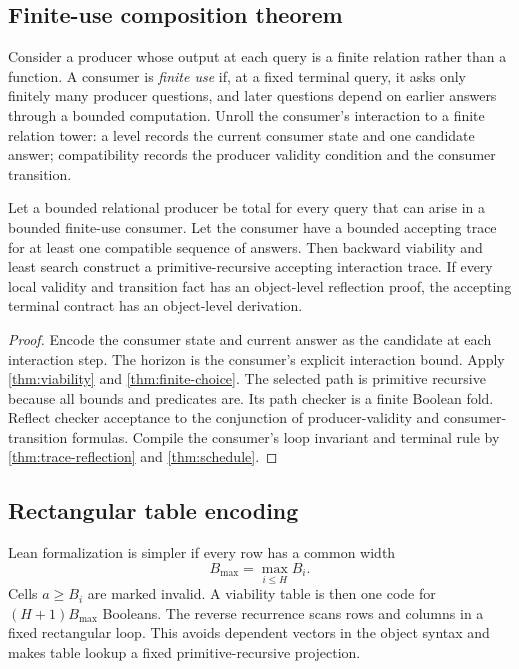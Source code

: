 \subsection{Finite-use composition theorem}

Consider a producer whose output at each query is a finite relation rather than a function.  A consumer is \emph{finite use} if, at a fixed terminal query, it asks only finitely many producer questions, and later questions depend on earlier answers through a bounded computation.  Unroll the consumer's interaction to a finite relation tower: a level records the current consumer state and one candidate answer; compatibility records the producer validity condition and the consumer transition.

\begin{theorem}\label{thm:finite-use}
Let a bounded relational producer be total for every query that can arise in a bounded finite-use consumer.  Let the consumer have a bounded accepting trace for at least one compatible sequence of answers.  Then backward viability and least search construct a primitive-recursive accepting interaction trace.  If every local validity and transition fact has an object-level reflection proof, the accepting terminal contract has an object-level derivation.
\end{theorem}

\begin{proof}
Encode the consumer state and current answer as the candidate at each interaction step.  The horizon is the consumer's explicit interaction bound.  Apply \cref{thm:viability} and \cref{thm:finite-choice}.  The selected path is primitive recursive because all bounds and predicates are.  Its path checker is a finite Boolean fold.  Reflect checker acceptance to the conjunction of producer-validity and consumer-transition formulas.  Compile the consumer's loop invariant and terminal rule by \cref{thm:trace-reflection} and \cref{thm:schedule}.
\end{proof}

\subsection{Rectangular table encoding}

Lean formalization is simpler if every row has a common width
\[
  B_{\max}=\max_{i\le H}B_i.
\]
Cells \(a\ge B_i\) are marked invalid.  A viability table is then one code for \((H+1)B_{\max}\) Booleans.  The reverse recurrence scans rows and columns in a fixed rectangular loop.  This avoids dependent vectors in the object syntax and makes table lookup a fixed primitive-recursive projection.

